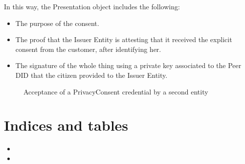 \documentclass[letterpaper,10pt,english]{sphinxmanual}
\begin{document}
\sphinxAtStartPar
In this way, the Presentation object includes the following:
\begin{itemize}
\item {} 
\sphinxAtStartPar
The purpose of the consent.

\item {} 
\sphinxAtStartPar
The proof that the Issuer Entity is attesting that it received the explicit consent from the customer, after identifying her.

\item {} 
\sphinxAtStartPar
The signature of the whole thing using a private key associated to the Peer DID that the citizen provided to the Issuer Entity.

\end{itemize}

\begin{figure}[htbp]
\centering
\capstart

\noindent{}
\caption{Acceptance of a PrivacyConsent credential by a second entity}\label{\detokenize{privacycred:id11}}\end{figure}


\chapter{Indices and tables}
\label{\detokenize{index:indices-and-tables}}\begin{itemize}
\item {} 
\sphinxAtStartPar
{}

\item {} 
\sphinxAtStartPar
{}

\end{itemize}


\renewcommand{\indexname}{HTTP Routing Table}
\begin{sphinxtheindex}
\let\bigletter\sphinxstyleindexlettergroup
\bigletter{/api}
\item\relax{}
\item\relax{}
\item\relax{}
\end{sphinxtheindex}

\renewcommand{\indexname}{Index}
\printindex
\end{document}
